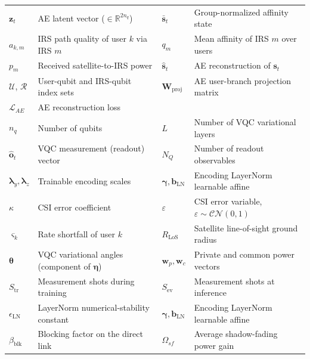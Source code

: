 \documentclass[12pt,onecolumn]{IEEEtran}
\begin{document}
\begin{table}[t]
\begin{tabularx}{\textwidth}{
>{\centering\arraybackslash}p{1.6cm}
>{\raggedright\arraybackslash}X
>{\centering\arraybackslash}p{1.6cm}
>{\raggedright\arraybackslash}X
}
$\mathbf{z}_t$
& AE latent vector ($\in\mathbb{R}^{2n_q}$)
& $\bar{\mathbf{s}}_t$
& Group-normalized affinity state \\

$a_{k,m}$
& IRS path quality of user $k$ via IRS $m$
& $q_m$
& Mean affinity of IRS $m$ over users \\

$p_m$
& Received satellite-to-IRS power
& $\hat{\mathbf{s}}_t$
& AE reconstruction of $\mathbf{s}_t$ \\

$\mathcal{U}$, $\mathcal{R}$
& User-qubit and IRS-qubit index sets
& $\mathbf{W}_{\mathrm{proj}}$
& AE user-branch projection matrix \\

$\mathcal{L}_{AE}$
& AE reconstruction loss
&
& \\

$n_q$
& Number of qubits
& $L$
& Number of VQC variational layers \\

$\hat{\mathbf{o}}_t$
& VQC measurement (readout) vector
& $N_Q$
& Number of readout observables \\

$\boldsymbol{\lambda}_y, \boldsymbol{\lambda}_z$
& Trainable encoding scales
& $\boldsymbol{\gamma}, \mathbf{b}_{\mathrm{LN}}$
& Encoding LayerNorm learnable affine \\

$\kappa$
& CSI error coefficient
& $\varepsilon$
& CSI error variable, $\varepsilon\sim\mathcal{CN}(0,1)$ \\

$\varsigma_k$
& Rate shortfall of user $k$
& $R_{\mathrm{LoS}}$
& Satellite line-of-sight ground radius \\

$\boldsymbol{\theta}$
& VQC variational angles (component of $\boldsymbol{\eta}$)
& $\mathbf{w}_p,\mathbf{w}_c$
& Private and common power vectors \\

$S_{\mathrm{tr}}$
& Measurement shots during training
& $S_{\mathrm{ev}}$
& Measurement shots at inference \\

$\epsilon_{\mathrm{LN}}$
& LayerNorm numerical-stability constant
& $\boldsymbol{\gamma},\mathbf{b}_{\mathrm{LN}}$
& Encoding LayerNorm learnable affine \\

$\beta_{\mathrm{blk}}$
& Blocking factor on the direct link
& $\Omega_{sf}$
& Average shadow-fading power gain \\
\end{tabularx}
\end{table}
\fi
\end{document}
